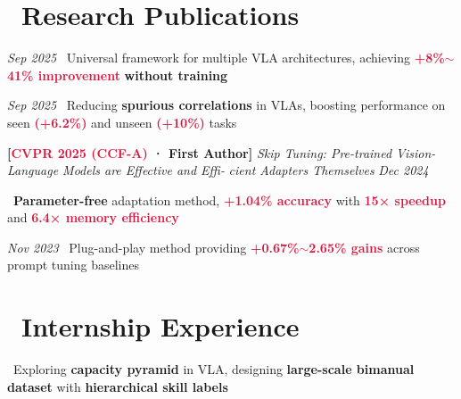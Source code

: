 \documentclass{resume}
\begin{document}
\vspace{-2pt}
\section{\faLightbulbO\ Research Publications}

{\textit{Sep 2025}}
\faAngleRight\ Universal framework for multiple VLA architectures, achieving \textcolor{crimson}{\textbf{+8\%$\sim$41\% improvement}} \textbf{without training}

{\textit{Sep 2025}}
\faAngleRight\ Reducing \textbf{spurious correlations} in VLAs, boosting performance on seen \textcolor{crimson}{\textbf{(+6.2\%)}} and unseen \textcolor{crimson}{\textbf{(+10\%)}} tasks

\textbf{[\textcolor{crimson}{CVPR 2025 (CCF-A)} · First Author]}
\textit{Skip Tuning: Pre-trained Vision-Language Models are Effective and Effi-}
\textit{cient Adapters Themselves}
\hfill
\textit{Dec 2024}

\faAngleRight\ \textbf{Parameter-free} adaptation method, \textcolor{crimson}{\textbf{+1.04\% accuracy}} with \textcolor{crimson}{\textbf{15× speedup}} and \textcolor{crimson}{\textbf{6.4× memory efficiency}}

{\textit{Nov 2023}}
\faAngleRight\ Plug-and-play method providing \textcolor{crimson}{\textbf{+0.67\%$\sim$2.65\% gains}} across prompt tuning baselines

\vspace{-2pt}
\section*{\faCoffee\ Internship Experience}
\faAngleRight\ Exploring \textbf{capacity pyramid} in VLA, designing \textbf{large-scale bimanual dataset} with \textbf{hierarchical skill labels}
\end{document}
